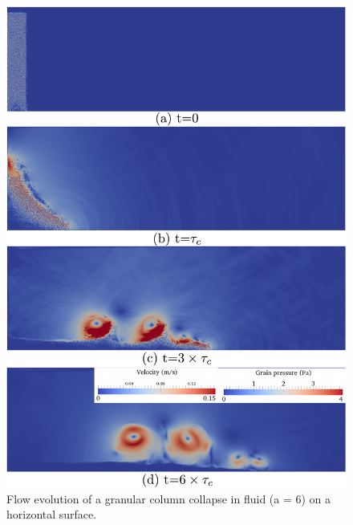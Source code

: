 \documentclass[epj,twocolumn]{webofc}
\begin{document}
\begin{figure}[htpb]
\centering
\includegraphics[width=0.9\linewidth]{figs/lbm_dem_a6}
\caption{Flow evolution of a granular column collapse in fluid (a = 6) on a 
horizontal surface.}
\label{fig:LBM_DEM_a6}
\end{figure}
\end{document}
